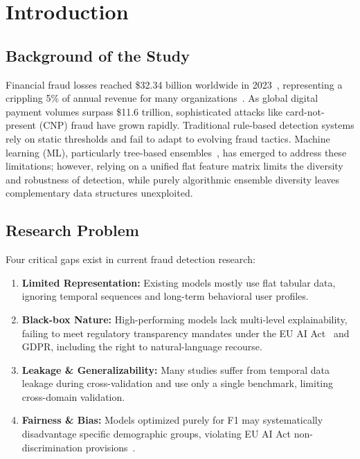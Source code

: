 \documentclass[10pt,a4paper,twocolumn]{article}
\begin{document}
\section{Introduction}
\subsection{Background of the Study}
Financial fraud losses reached \$32.34 billion worldwide in 2023~\cite{nilson2024}, representing a crippling 5\% of annual revenue for many organizations~\cite{acfe2024}. As global digital payment volumes surpass \$11.6 trillion, sophisticated attacks like card-not-present (CNP) fraud have grown rapidly. Traditional rule-based detection systems rely on static thresholds and fail to adapt to evolving fraud tactics. Machine learning (ML), particularly tree-based ensembles~\cite{chen2016,ke2017}, has emerged to address these limitations; however, relying on a unified flat feature matrix limits the diversity and robustness of detection, while purely algorithmic ensemble diversity leaves complementary data structures unexploited.

\subsection{Research Problem}
Four critical gaps exist in current fraud detection research:
\begin{enumerate}
    \item \textbf{Limited Representation:} Existing models mostly use flat tabular data, ignoring temporal sequences and long-term behavioral user profiles.
    \item \textbf{Black-box Nature:} High-performing models lack multi-level explainability, failing to meet regulatory transparency mandates under the EU AI Act~\cite{euaiact2024} and GDPR, including the right to natural-language recourse.
    \item \textbf{Leakage \& Generalizability:} Many studies suffer from temporal data leakage during cross-validation and use only a single benchmark, limiting cross-domain validation.
    \item \textbf{Fairness \& Bias:} Models optimized purely for F1 may systematically disadvantage specific demographic groups, violating EU AI Act non-discrimination provisions~\cite{euaiact2024}.
\end{enumerate}
\end{document}
